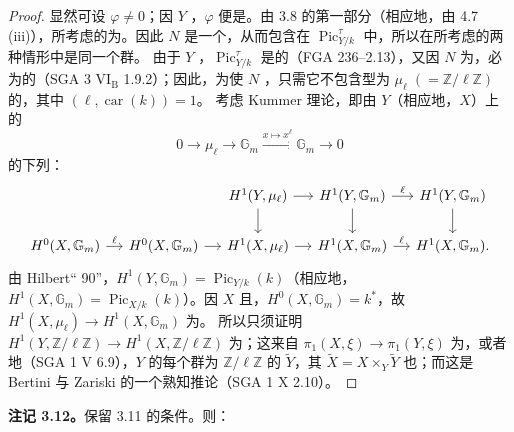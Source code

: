 \begin{proof}
显然可设 $\varphi\neq0$；因 $Y$ ，$\varphi$ 便是。由 3.8 的第一部分（相应地，由 4.7 (iii)），所考虑的为。因此 $N$ 是一个，从而包含在 $\operatorname{Pic}_{Y/k}^{\tau}$ 中，所以在所考虑的两种情形中是同一个群。
由于 $Y$ ，$\operatorname{Pic}_{Y/k}^{\tau}$ 是的（FGA 236--2.13），又因 $N$ 为，必为的（SGA 3 VI$_{\mathrm B}$ 1.9.2）；因此，为使 $N$ ，只需它不包含型为 $\mu_\ell\;(=\mathbb Z/\ell\mathbb Z)$ 的，其中 $(\ell,\operatorname{car}(k))=1$。
考虑 Kummer 理论，即由 $Y$（相应地，$X$）上的
\[0\longrightarrow\mu_\ell\longrightarrow\mathbb G_m\xrightarrow{x\mapsto x^\ell}\mathbb G_m\longrightarrow0\]
的下列：
\[
\begin{tikzcd}[column sep=small]
&&H^1(Y,\mu_\ell)\arrow[r]\arrow[d]&H^1(Y,\mathbb G_m)\arrow[r,"\ell"]\arrow[d]&H^1(Y,\mathbb G_m)\arrow[d]\\
H^0(X,\mathbb G_m)\arrow[r,"\ell"]&H^0(X,\mathbb G_m)\arrow[r]&H^1(X,\mu_\ell)\arrow[r]&H^1(X,\mathbb G_m)\arrow[r,"\ell"]&H^1(X,\mathbb G_m).
\end{tikzcd}
\]
由 Hilbert“ 90”，$H^1(Y,\mathbb G_m)=\operatorname{Pic}_{Y/k}(k)$（相应地，$H^1(X,\mathbb G_m)=\operatorname{Pic}_{X/k}(k)$）。因 $X$ 且，$H^0(X,\mathbb G_m)=k^*$，故 $H^1(X,\mu_\ell)\to H^1(X,\mathbb G_m)$ 为。
所以只须证明 $H^1(Y,\mathbb Z/\ell\mathbb Z)\to H^1(X,\mathbb Z/\ell\mathbb Z)$ 为；这来自 $\pi_1(X,\xi)\to\pi_1(Y,\xi)$ 为，或者地（SGA 1 V 6.9），$Y$ 的每个群为 $\mathbb Z/\ell\mathbb Z$ 的 $\widetilde Y$，其 $\widetilde X=X\times_Y\widetilde Y$ 也；而这是 Bertini 与 Zariski 的一个熟知推论（SGA 1 X 2.10）。
\end{proof}
\textbf{注记 3.12。}保留 3.11 的条件。则：

